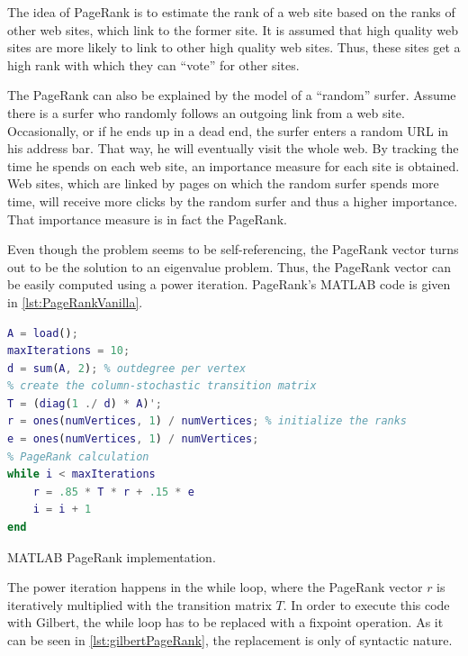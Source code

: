 The idea of PageRank is to estimate the rank of a web site based on the ranks of other web sites, which link to the former site.
It is assumed that high quality web sites are more likely to link to other high quality web sites.
Thus, these sites get a high rank with which they can ``vote'' for other sites.

The PageRank can also be explained by the model of a ``random'' surfer.
Assume there is a surfer who randomly follows an outgoing link from a web site.
Occasionally, or if he ends up in a dead end, the surfer enters a random URL in his address bar.
That way, he will eventually visit the whole web.
By tracking the time he spends on each web site, an importance measure for each site is obtained.
Web sites, which are linked by pages on which the random surfer spends more time, will receive more clicks by the random surfer and thus a higher importance.
That importance measure is in fact the PageRank.

Even though the problem seems to be self-referencing, the PageRank vector turns out to be the solution to an eigenvalue problem.
Thus, the PageRank vector can be easily computed using a power iteration.
PageRank's MATLAB code is given in \cref{lst:PageRankVanilla}.

\begin{listing}[!h]
	\begin{CenteredBox}
		\begin{lstlisting}[language=Matlab,
		commentstyle=\color{black},
		  stringstyle=\color{black},
		  keywordstyle=\color{black}\bfseries,
		  morekeywords={ones},]
% load adjacency matrix
A = load(); 
maxIterations = 10;
d = sum(A, 2); % outdegree per vertex
% create the column-stochastic transition matrix
T = (diag(1 ./ d) * A)'; 
r = ones(numVertices, 1) / numVertices; % initialize the ranks
e = ones(numVertices, 1) / numVertices;
% PageRank calculation
while i < maxIterations
	r = .85 * T * r + .15 * e
	i = i + 1
end
		\end{lstlisting}
	\end{CenteredBox}
	\caption{MATLAB PageRank implementation.}
	\label{lst:PageRankVanilla}
\end{listing}

The power iteration happens in the while loop, where the PageRank vector $r$ is iteratively multiplied with the transition matrix $T$.
In order to execute this code with Gilbert, the while loop has to be replaced with a fixpoint operation.
As it can be seen in \cref{lst:gilbertPageRank}, the replacement is only of syntactic nature.

